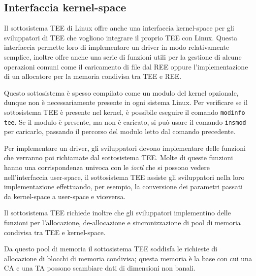 \documentclass[12pt,italian]{report}
\begin{document}
\subsection{Interfaccia kernel-space}
\label{sec:interfaccia-kernel-space}
Il sottosistema TEE di Linux offre anche una interfaccia kernel-space per
gli sviluppatori di TEE che vogliono integrare il proprio TEE con Linux.
Questa interfaccia permette loro di implementare un driver in modo
relativamente semplice, inoltre offre anche una serie di funzioni
utili per la gestione di alcune operazioni comuni come il caricamento
di file dal REE oppure l'implementazione di un allocatore per la memoria
condivisa tra TEE e REE.

Questo sottosistema è spesso compilato come un modulo del kernel opzionale,
dunque non è necessariamente presente in ogni sistema Linux.
Per verificare se il sottosistema TEE è presente nel kernel, è possibile
eseguire il comando \texttt{modinfo tee}.
Se il modulo è presente, ma non è caricato, si può usare il comando
\texttt{insmod} per caricarlo, passando il percorso del modulo letto
dal comando precedente.

\bigbreak \noindent

Per implementare un driver, gli sviluppatori devono implementare
delle funzioni che verranno poi richiamate dal sottosistema TEE.
Molte di queste funzioni hanno una corrispondenza univoca con le
\textit{ioctl} che si possono vedere nell'interfaccia user-space,
il sottosistema TEE assiste gli sviluppatori nella loro
implementazione effettuando, per esempio, la conversione dei parametri
passati da kernel-space a user-space e viceversa.

Il sottosistema TEE richiede inoltre che gli sviluppatori
implementino delle funzioni per l'allocazione, de-allocazione e
sincronizzazione di pool di memoria condivisa tra TEE e kernel-space.

Da questo pool di memoria il sottosistema TEE soddisfa le richieste
di allocazione di blocchi di memoria condivisa; questa memoria è la base
con cui una CA e una TA possono scambiare dati di dimensioni non banali.
\end{document}
